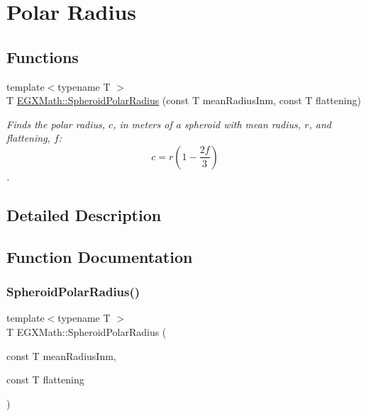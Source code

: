 \hypertarget{group___e_g_x_math-_geometry-3_d-_spheroid-_polar_radius}{}\section{Polar Radius}
\label{group___e_g_x_math-_geometry-3_d-_spheroid-_polar_radius}
\subsection*{Functions}
\begin{DoxyCompactItemize}
\item 
{\footnotesize template$<$typename T $>$ }\\T \mbox{\hyperlink{group___e_g_x_math-_geometry-3_d-_spheroid-_polar_radius_gad4791a46a7efe39c63c03d2366fdd3d2}{E\+G\+X\+Math\+::\+Spheroid\+Polar\+Radius}} (const T mean\+Radius\+Inm, const T flattening)
\begin{DoxyCompactList}\small\item\em Finds the polar radius, $c$, in meters of a spheroid with mean radius, $r$, and flattening, $f$\+: \[ c = r \left (1 - \dfrac{2f}{3} \right ) \]. \end{DoxyCompactList}\end{DoxyCompactItemize}


\subsection{Detailed Description}


\subsection{Function Documentation}
\mbox{\label{group___e_g_x_math-_geometry-3_d-_spheroid-_polar_radius_gad4791a46a7efe39c63c03d2366fdd3d2}} 
\subsubsection{\texorpdfstring{Spheroid\+Polar\+Radius()}{SpheroidPolarRadius()}}
{\footnotesize\ttfamily template$<$typename T $>$ \\
T E\+G\+X\+Math\+::\+Spheroid\+Polar\+Radius (\begin{DoxyParamCaption}\item[{const T}]{mean\+Radius\+Inm,  }\item[{const T}]{flattening }\end{DoxyParamCaption})}



